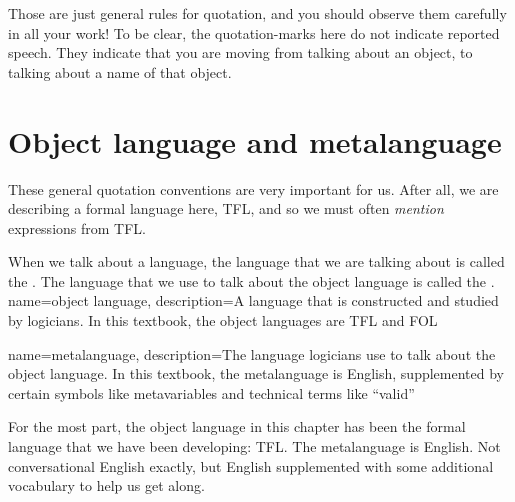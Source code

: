 Those are just general rules for quotation, and you should observe them carefully in all your work! To be clear, the quotation-marks here do not indicate reported speech. They indicate that you are moving from talking about an object, to talking about a name of that object.


\section{Object language and metalanguage}
These general quotation conventions are very important for us. After all, we are describing a formal language here, TFL, and so we must often \emph{mention} expressions from TFL.

When we talk about a language, the language that we are talking about is called the . The language that we use to talk about the object language is called the .
\label{def.metalanguage}
{
name=object language,
description={A language that is constructed and studied by logicians. In this textbook,
 the object languages are TFL and FOL}
}

{
name=metalanguage,
description={The language logicians use to talk about the object language. In this textbook, the metalanguage is English, supplemented by certain symbols like metavariables and technical terms like ``valid''}
}

For the most part, the object language in this chapter has been the formal language that we have been developing: TFL. The metalanguage is English. Not conversational English exactly, but English supplemented with some additional vocabulary to help us get along.

